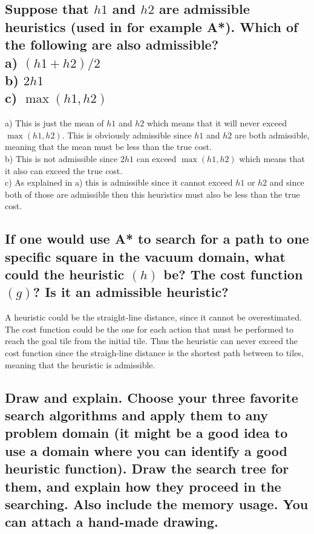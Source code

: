 \documentclass[a4paper,10pt]{article}
\begin{document}
\subsection{ Suppose that $h1$ and $h2$ are admissible heuristics (used in for example A*). Which of the following are also admissible?
\\a) $(h1+h2)/2$
\\b) $2h1$
\\c) $\max(h1,h2)$}

a) This is just the mean of $h1$ and $h2$ which means that it will never exceed $\max(h1, h2)$.
This is obviously admissible since $h1$ and $h2$ are both admissible, meaning that the mean must be less than the true cost.
\\
b) This is not admissible since $2h1$ can exceed $\max(h1, h2)$ which means that it also can exceed the true cost.
\\
c) As explained in a) this is admissible since it cannot exceed $h1$ or $h2$ and since both of those are admissible then
this heuristics must also be less than the true cost.

\subsection{If one would use A* to search for a path to one specific square in the vacuum domain, what could the heuristic $(h)$ be? The cost function $(g)$? Is it an admissible heuristic?}

A heuristic could be the straight-line distance, since it cannot be overestimated. 
The cost function could be the one for each action that must be performed to reach the goal tile from the initial tile.
Thus the heuristic can never exceed the cost function since the straigh-line distance is the shortest path between to tiles, meaning that the heuristic is admissible.

\subsection{Draw and explain. 
Choose your three favorite search algorithms and apply them to any problem domain (it might be a good idea to use a domain where you can identify a good heuristic function). 
Draw the search tree for them, and explain how they proceed in the searching. 
Also include the memory usage. 
You can attach a hand-made drawing.}
\end{document}
